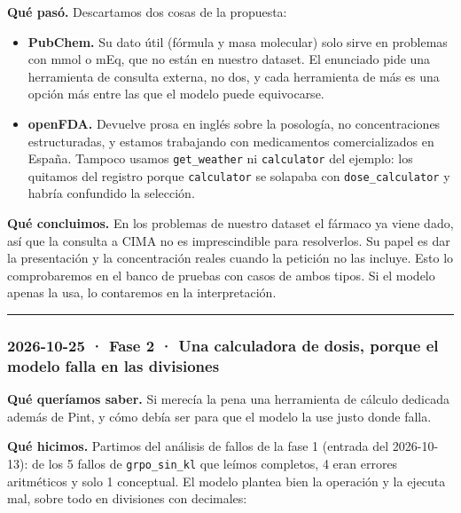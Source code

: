 \textbf{Qué pasó.} Descartamos dos cosas de la propuesta:

\begin{itemize}
\tightlist
\item
  \textbf{PubChem.} Su dato útil (fórmula y masa molecular) solo sirve en problemas con mmol o mEq, que
  no están en nuestro dataset. El enunciado pide una herramienta de consulta externa, no dos, y
  cada herramienta de más es una opción más entre las que el modelo puede equivocarse.
\item
  \textbf{openFDA.} Devuelve prosa en inglés sobre la posología, no concentraciones estructuradas, y
  estamos trabajando con medicamentos comercializados en España.
  Tampoco usamos \texttt{get\_\allowbreak{}weather} ni \texttt{calculator} del ejemplo: los quitamos del registro porque
  \texttt{calculator} se solapaba con \texttt{dose\_\allowbreak{}calculator} y habría confundido la selección.
\end{itemize}

\textbf{Qué concluimos.} En los problemas de nuestro dataset el fármaco ya viene dado, así que la
consulta a CIMA no es imprescindible para resolverlos. Su papel es dar la presentación y la
concentración reales cuando la petición no las incluye. Esto lo comprobaremos en el banco de
pruebas con casos de ambos tipos. Si el modelo apenas la usa, lo contaremos en la interpretación.

\begin{center}\rule{0.5\linewidth}{0.5pt}\end{center}

\subsubsection{2026-10-25 · Fase 2 · Una calculadora de dosis, porque el modelo falla en las divisiones}

\textbf{Qué queríamos saber.} Si merecía la pena una herramienta de cálculo dedicada además de Pint, y
cómo debía ser para que el modelo la use justo donde falla.

\textbf{Qué hicimos.} Partimos del análisis de fallos de la fase 1 (entrada del 2026-10-13): de los 5
fallos de \texttt{grpo\_\allowbreak{}sin\_\allowbreak{}kl} que leímos completos, 4 eran errores aritméticos y solo 1 conceptual.
El modelo plantea bien la operación y la ejecuta mal, sobre todo en divisiones con decimales:

